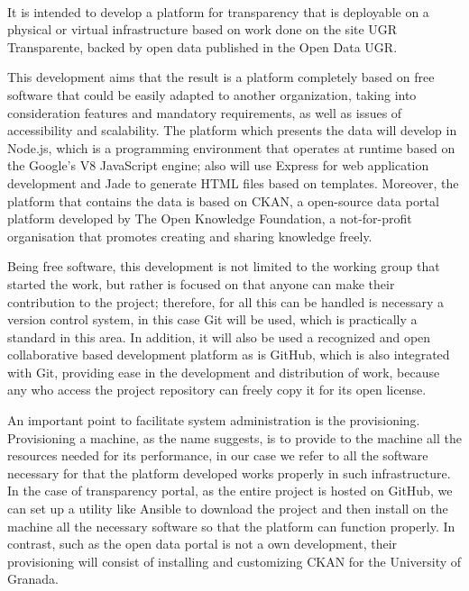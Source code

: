 {\bigskip
{}\\

It is intended to develop a platform for transparency that is deployable on a physical or virtual infrastructure based on work
done on the site UGR Transparente, backed by open data published in the Open Data UGR.

\bigskip
This development aims that the result is a platform completely based on free software that could be easily adapted to another
organization, taking into consideration features and mandatory requirements, as well as issues of accessibility and scalability.
The platform which presents the data will develop in Node.js, which is a programming environment that operates at runtime based
on the Google's V8 JavaScript engine; also will use Express for web application development and Jade to generate HTML files
based on templates. Moreover, the platform that contains the data is based on CKAN, a open-source data portal platform
developed by The Open Knowledge Foundation, a not-for-profit organisation that promotes creating and sharing knowledge freely.

\bigskip
Being free software, this development is not limited to the working group that started the work, but rather is focused on that
anyone can make their contribution to the project; therefore, for all this can be handled is necessary a version control system,
in this case Git will be used, which is practically a standard in this area. In addition, it will also be used a recognized and
open collaborative based development platform as is GitHub, which is also integrated with Git, providing ease in the 
development and distribution of work, because any who access the project repository can freely copy it for its open license.

\bigskip
An important point to facilitate system administration is the provisioning. Provisioning a machine, as the name suggests, is to
provide to the machine all the resources needed for its performance, in our case we refer to all the software necessary for
that the platform developed works properly in such infrastructure. In the case of transparency portal, as the entire project
is hosted on GitHub, we can set up a utility like Ansible to download the project and then install on the machine all the
necessary software so that the platform can function properly. In contrast, such as the open data portal is not a own
development, their provisioning will consist of installing and customizing CKAN for the University of Granada.

}
